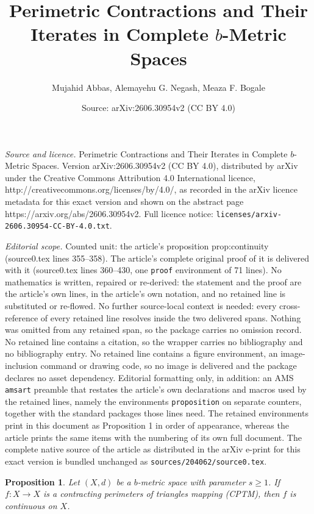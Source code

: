 \documentclass[10pt,a4paper]{amsart}
\title{Perimetric Contractions and Their Iterates in Complete $b$-Metric Spaces}
\author{Mujahid Abbas, Alemayehu G. Negash, Meaza F. Bogale}
\date{Source: arXiv:2606.30954v2 (CC BY 4.0)}
\newtheorem{proposition}{Proposition}
\begin{document}
\maketitle

\noindent\emph{Source and licence.} Perimetric Contractions and Their Iterates in Complete $b$-Metric Spaces. Version arXiv:2606.30954v2 (CC BY 4.0), distributed by arXiv under the Creative Commons Attribution 4.0 International licence, http://creativecommons.org/licenses/by/4.0/, as recorded in the arXiv licence metadata for this exact version and shown on the abstract page https://arxiv.org/abs/2606.30954v2. Full licence notice: \texttt{licenses/arxiv-2606.30954-CC-BY-4.0.txt}.\par\smallskip

\noindent\textit{Editorial scope.} Counted unit: the article's proposition prop:continuity (source0.tex lines 355--358). The article's complete original proof of it is delivered with it (source0.tex lines 360--430, one \texttt{proof} environment of 71 lines). No mathematics is written, repaired or re-derived: the statement and the proof are the article's own lines, in the article's own notation, and no retained line is substituted or re-flowed.  No further source-local context is needed: every cross-reference of every retained line resolves inside the two delivered spans.  Nothing was omitted from any retained span, so the package carries no omission record.  No retained line contains a citation, so the wrapper carries no bibliography and no bibliography entry.  No retained line contains a figure environment, an image-inclusion command or drawing code, so no image is delivered and the package declares no asset dependency.  Editorial formatting only, in addition: an AMS \texttt{amsart} preamble that restates the article's own declarations and macros used by the retained lines, namely the environments \texttt{proposition} on separate counters, together with the standard packages those lines need.  The retained environments print in this document as Proposition 1 in order of appearance, whereas the article prints the same items with the numbering of its own full document.  The complete native source of the article as distributed in the arXiv e-print for this exact version is bundled unchanged as \texttt{sources/204062/source0.tex}.
\begin{proposition}
\label{prop:continuity}
Let $(X,d)$ be a $b$-metric space with parameter $s\geq 1$. If $f:X\to X$ is a contracting perimeters of triangles mapping (CPTM), then $f$ is continuous on $X$.
\end{proposition}
\end{document}
